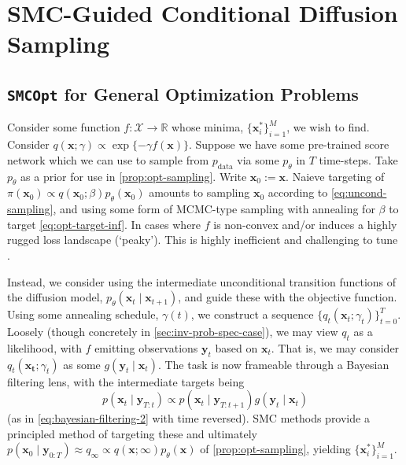 \chapter{SMC-Guided Conditional Diffusion Sampling}

\section{\texttt{SMCOpt} for General Optimization Problems} \label{sec:gen-opt}

Consider some function $f: \mathcal{X} \to \mathbb{R}$ whose minima, $\{\mathbf{x}^*_i\}_{i=1}^M$,
we wish to find. Consider $q(\mathbf{x}; \gamma) \propto \exp\{-\gamma f(\mathbf{x})\}$. Suppose we
have some pre-trained score network which we can use to sample from $p_{\text{data}}$ via some
$p_\theta$ in $T$ time-steps. Take $p_\theta$ as a prior for use in  \ref{prop:opt-sampling}. Write
$\mathbf{x}_0 := \mathbf{x}$. Naieve targeting of
$\pi(\mathbf{x}_0) \propto q(\mathbf{x}_0; \beta)p_\theta(\mathbf{x}_0)$ amounts to sampling
$\mathbf{x}_0$ according to \ref{eq:uncond-sampling}, and using some form of MCMC-type sampling with
annealing for $\beta$ to target \ref{eq:opt-target-inf}. In cases where $f$ is non-convex and/or
induces a highly rugged loss landscape (`peaky'). This is highly inefficient and challenging
to tune \parencite{kongDiffusionModelsConstrained2024}.

Instead, we consider using the intermediate unconditional transition functions of the diffusion
model, $p_\theta(\mathbf{x}_{t} \mid \mathbf{x}_{t+1})$, and guide these with the objective
function. Using some annealing schedule, $\gamma(t)$, we construct a sequence
$\{q_t(\mathbf{x}_t; \gamma_t)\}_{t=0}^T$. Loosely (though concretely in
\ref{sec:inv-prob-spec-case}), we may view $q_t$ as a likelihood, with $f$ emitting observations
$\mathbf{y}_t$ based on $\mathbf{x}_t$. That is, we may consider $q_t(\mathbf{x_t}; \gamma_t)$
as some $g(\mathbf{y}_t \mid \mathbf{x}_t)$. The task is now frameable through a Bayesian filtering
lens, with the intermediate targets being
\begin{equation}
    p(\mathbf{x}_t \mid \mathbf{y}_{T:t}) \propto p(\mathbf{x}_t \mid \mathbf{y}_{T:t+1})g(\mathbf{y}_t \mid \mathbf{x}_t)
\end{equation}
(as in \ref{eq:bayesian-filtering-2} with time reversed). SMC methods provide a principled
method of targeting these and ultimately
$p(\mathbf{x}_0 \mid \mathbf{y}_{0:T}) \approx q_\infty \propto q(\mathbf{x}; \infty)p_\theta(\mathbf{x})$
of \ref{prop:opt-sampling}, yielding $\{\mathbf{x}^*_i\}_{i=1}^M$.

